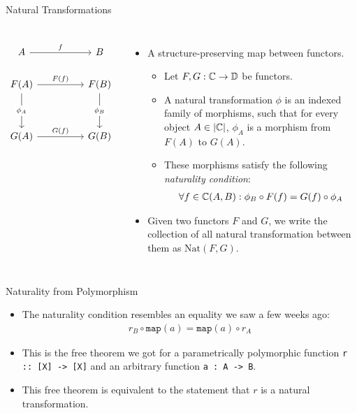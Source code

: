 \begin{frame}[fragile]{Natural Transformations}
	\begin{columns}
		\[\begin{tikzcd}
			A && B \\
			{F(A)} && {F(B)} \\
			\\
			{G(A)} && {G(B)}
			\arrow["f", from=1-1, to=1-3]
			\arrow["{F(f)}", from=2-1, to=2-3]
			\arrow["{\phi_A}"{description}, from=2-1, to=4-1]
			\arrow["{\phi_B}"{description}, from=2-3, to=4-3]
			\arrow["{G(f)}", from=4-1, to=4-3]
		\end{tikzcd}\]
	    \begin{itemize}
	     \item A structure-preserving map between functors.
	     \begin{itemize}
	      \item Let $F,G : \mathbb{C} \to \mathbb{D}$ be functors.
	      \item A natural transformation $\phi$ is an indexed family of morphisms, such that for every object $A \in |\mathbb{C}|$,  $\phi_A$ is a morphism from $F(A)$ to $G(A)$.
	      \item These morphisms satisfy the following \textit{naturality condition}:
	      \begin{align*}
	       \forall f \in \mathbb{C}(A,B) : \phi_B \circ F(f) = G(f) \circ \phi_A
	      \end{align*}
	     \end{itemize}
	     \item Given two functors $F$ and $G$, we write the collection of all natural transformation between them as $\text{Nat}(F, G)$.
	    \end{itemize}
	\end{columns}
\end{frame}
\begin{frame}{Naturality from Polymorphism}
    \begin{itemize}
      \item The naturality condition resembles an equality we saw a few weeks ago:
      \begin{align*}
       r_B \circ \texttt{map}(a) = \texttt{map}(a) \circ r_A
      \end{align*}
      \pause \item This is the free theorem we got for a parametrically polymorphic function \texttt{r :: [X] -> [X]} and an arbitrary function \texttt{a : A -> B}.
      \pause \item This free theorem is equivalent to the statement that $r$ is a natural transformation.
    \end{itemize}
\end{frame}
